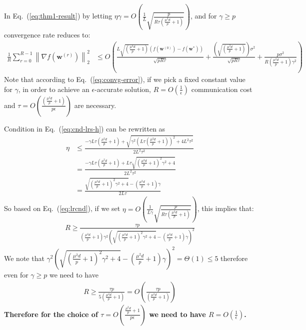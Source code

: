 \begin{corollary} 
In Eq.~(\ref{eq:thm1-result}) by letting $\eta\gamma=O\left(\frac{1}{L}\sqrt{\frac{p}{R\tau\left(\frac{\mu^2 d}{p}+1\right)}}\right)$, and for $\gamma\geq p$  convergence rate reduces to:
\begin{align}
    \frac{1}{R}\sum_{r=0}^{R-1}\left\|\nabla f({\boldsymbol{w}}^{(r)})\right\|_2^2&\leq O\left(\frac{L\sqrt{\left(\frac{\mu^2 d}{p}+1\right)}\left(f(\boldsymbol{w}^{(0)})-f(\boldsymbol{w}^{*})\right)}{\sqrt{pR\tau}}+\frac{\left(\sqrt{\left(\frac{\mu^2 d}{p}+1\right)}\right)\sigma^2}{\sqrt{pR\tau}}+\frac{p\sigma^2}{R\left(\frac{\mu^2 d}{p}+1\right)\gamma^2}\right)\label{eq:convg-error}
\end{align}
Note that according to Eq.~(\ref{eq:convg-error}), if we pick  a fixed constant value for  $\gamma$, in order to achieve an $\epsilon$-accurate solution, $R=O\left(\frac{1}{\epsilon}\right)$ communication cost and $\tau=O\left(\frac{\left(\frac{\mu^2 d}{p}+1\right)}{p\epsilon}\right)$ are necessary.

\end{corollary}




\begin{remark}\label{rmk:cnd-lr}

Condition in Eq.~(\ref{eq:cnd-lrs-h}) can be rewritten as 
\begin{align}
    \eta&\leq \frac{-\gamma L\tau\left(\frac{\mu^2 d}{p}+1\right)+\sqrt{\gamma^2 \left(L\tau\left(\frac{\mu^2 d}{p}+1\right)\right)^2+4L^2\tau^2}}{2L^2\tau^2}\nonumber\\
    &= \frac{-\gamma L\tau\left(\frac{\mu^2 d}{p}+1\right)+L\tau\sqrt{\left(\frac{\mu^2 d}{p}+1\right)^2\gamma^2 +4}}{2L^2\tau^2}\nonumber\\
    &=\frac{\sqrt{\left(\frac{\mu^2 d}{p}+1\right)^2\gamma^2 +4}-\left(\frac{\mu^2 d}{p}+1\right)\gamma}{2L\tau}\label{eq:lrcnd}
\end{align}
So based on Eq.~(\ref{eq:lrcnd}), if we set $\eta=O\left(\frac{1}{L\gamma}\sqrt{\frac{p}{R\tau\left(\frac{\mu^2 d}{p}+1\right)}}\right)$, this implies that:
\begin{align}
    R\geq \frac{\tau p}{\left(\frac{\mu^2 d}{p}+1\right)\gamma^2\left(\sqrt{\left(\frac{\mu^2 d}{p}+1\right)^2\gamma^2+4}-\left(\frac{\mu^2 d}{p}+1\right)\gamma\right)^2}\label{eq:iidexact}
\end{align}
We note that $\gamma^2\left(\sqrt{\left(\frac{\mu^2 d}{p}+1\right)^2\gamma^2+4}-\left(\frac{\mu^2 d}{p}+1\right)\gamma\right)^2=\Theta(1)\leq 5 $ therefore even for $\gamma\geq p$ we need to have 
\begin{align}
    R\geq \frac{\tau p}{5\left(\frac{\mu^2 d}{p}+1\right)}=O\left(\frac{\tau p}{\left(\frac{\mu^2 d}{p}+1\right)}\right)
\end{align}
\textbf{Therefore for the choice of $\tau=O\left(\frac{\frac{\mu^2 d}{p}+1}{p\epsilon}\right)$ we need to have $R=O\left(\frac{1}{\epsilon}\right)$.}
\end{remark}


